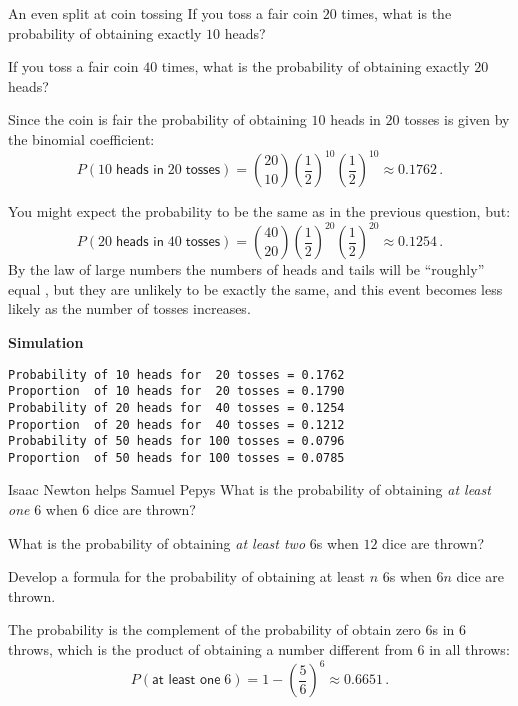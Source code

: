 
\begin{prob}{An even split at coin tossing}
 If you toss a fair coin $20$ times, what is the probability of obtaining exactly $10$ heads?

 If you toss a fair coin $40$ times, what is the probability of obtaining exactly $20$ heads?
\end{prob}

\solution{}

 Since the coin is fair the probability of obtaining $10$ heads in $20$ tosses is given by the binomial coefficient:
\[
P(10\;\textsf{heads in}\; 20\; \textsf{tosses})={20 \choose 10} \left(\frac{1}{2}\right)^{10}\left(\frac{1}{2}\right)^{10} \approx 0.1762\,.
\]

 You might expect the probability to be the same as in the previous question, but:
\[
P(20\;\textsf{heads in}\; 40\; \textsf{tosses})={40 \choose 20} \left(\frac{1}{2}\right)^{20}\left(\frac{1}{2}\right)^{20}\approx 0.1254\,.
\]
By the law of large numbers the numbers of heads and tails will be ``roughly'' equal \cite[Section~8.4]{ross}, but they are unlikely to be exactly the same, and this event becomes less likely as the number of tosses increases.

\textbf{Simulation}
\begin{verbatim}
Probability of 10 heads for  20 tosses = 0.1762
Proportion  of 10 heads for  20 tosses = 0.1790
Probability of 20 heads for  40 tosses = 0.1254
Proportion  of 20 heads for  40 tosses = 0.1212
Probability of 50 heads for 100 tosses = 0.0796
Proportion  of 50 heads for 100 tosses = 0.0785
\end{verbatim}


\begin{prob}{Isaac Newton helps Samuel Pepys}
 What is the probability of obtaining \emph{at least one} $6$ when $6$ dice are thrown?

 What is the probability of obtaining \emph{at least two} $6$s when $12$ dice are thrown?

 Develop a formula for the probability of obtaining at least $n$ $6$s when $6n$ dice are thrown.
\end{prob}

\solution{}

 The probability is the complement of the probability of obtain zero $6$s in $6$ throws, which is the product of obtaining a number different from $6$ in all throws:
\[
P(\textsf{at least one}\; 6)=1-\left(\frac{5}{6}\right)^6\approx 0.6651\,.
\]

